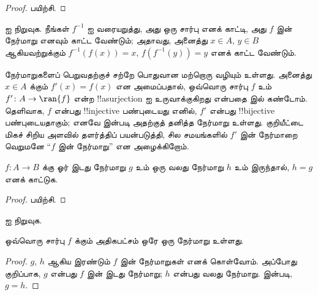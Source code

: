\documentclass[../../../include/open-logic-section]{subfiles}
\begin{document}
\begin{proof}
பயிற்சி.
\end{proof}

\begin{prob}
 ஐ நிறுவுக.
நீங்கள் $f^{-1}$ ஐ வரையறுத்து, அது ஒரு சார்பு எனக் காட்டி,
அது $f$ இன் நேர்மாறு எனவும் காட்ட வேண்டும்;
அதாவது, அனைத்து $x \in A$, $y \in B$ ஆகியவற்றுக்கும்
$f^{-1}(f(x)) = x$, $f(f^{-1}(y)) = y$ எனக் காட்ட வேண்டும்.
\end{prob}

\begin{explain}
நேர்மாறுகளைப் பெறுவதற்குச் சற்றே பொதுவான மற்றொரு வழியும் உள்ளது.
அனைத்து $x \in A$ க்கும் $f'(x) = f(x)$ என அமைப்பதால்,
ஒவ்வொரு சார்பு $f$ உம் $f'
\colon A \to \ran{f}$ என்ற !!a{surjection} ஐ உருவாக்குகிறது
என்பதை  இல் கண்டோம்.
தெளிவாக, $f$ என்பது !!{injective} பண்புடையது எனில்,
$f'$ என்பது !!{bijective} பண்புடையதாகும்;
எனவே  இன்படி அதற்குத் தனித்த
நேர்மாறு உள்ளது. குறியீட்டை மிகச் சிறிய அளவில் தளர்த்திப் பயன்படுத்தி,
சில சமயங்களில் $f'$ இன் நேர்மாறை வெறுமனே
“$f$ இன் நேர்மாறு” என அழைக்கிறோம்.
\end{explain}

\begin{prop}%
$f\colon A \to B$ க்கு ஓர் இடது நேர்மாறு $g$ உம்
ஒரு வலது நேர்மாறு $h$ உம் இருந்தால், $h = g$ எனக் காட்டுக.
\end{prop}

\begin{proof}
பயிற்சி.
\end{proof}

\begin{prob}
 ஐ நிறுவுக.
\end{prob}

\begin{prop}
ஒவ்வொரு சார்பு $f$ க்கும் அதிகபட்சம் ஒரே ஒரு நேர்மாறு உள்ளது.
\end{prop}

\begin{proof}
$g$, $h$ ஆகிய இரண்டும் $f$ இன் நேர்மாறுகள் எனக் கொள்வோம்.
அப்போது குறிப்பாக, $g$ என்பது $f$ இன் இடது நேர்மாறு;
$h$ என்பது வலது நேர்மாறு.
 இன்படி, $g = h$.
\end{proof}
\end{document}
